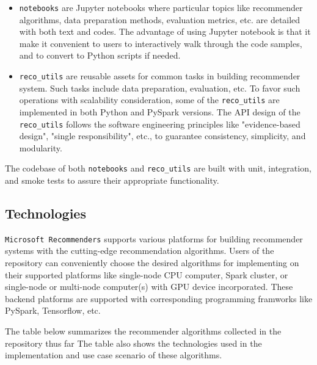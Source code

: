 \documentclass[twoside,11pt]{article}
\begin{document}
\begin{itemize}
 \item \verb|notebooks| are Jupyter notebooks where particular topics like recommender algorithms, data preparation methods, evaluation metrics, etc. are detailed with both text and codes. The advantage of using Jupyter notebook is that it make it convenient to users to interactively walk through the code samples, and to convert to Python scripts if needed.
 \item \verb|reco_utils| are reusable assets for common tasks in building recommender system. Such tasks include data preparation, evaluation, etc. To favor such operations with scalability consideration, some of the \verb|reco_utils| are implemented in both Python and PySpark versions. The API design of the \verb|reco_utils| follows the software engineering principles like "evidence-based design", "single responsibility", etc., to guarantee consistency, simplicity, and modularity.
\end{itemize}
The codebase of both \verb|notebooks| and \verb|reco_utils| are built with unit, integration, and smoke tests to assure their appropriate functionality.

\subsection{Technologies}
\verb|Microsoft Recommenders| supports various platforms for building recommender systems with the cutting-edge recommendation algorithms. Users of the repository can conveniently choose the desired algorithms for implementing on their supported platforms like single-node CPU computer, Spark cluster, or single-node or multi-node computer(s) with GPU device incorporated. These backend platforms are supported with corresponding programming framworks like PySpark, Tensorflow, etc. \citep{abadi2016tensorflow}

 The table below summarizes the recommender algorithms collected in the repository thus far \citep{ke2017lightgbm,wang2018dkn,lian2018xdeepfm,howard2018fastai,he2017neural,salakhutdinov2007restricted,cheng2016wide,diev2015sar,koren2009matrix} The table also shows the technologies used in the implementation and use case scenario of these algorithms. 
\end{document}

